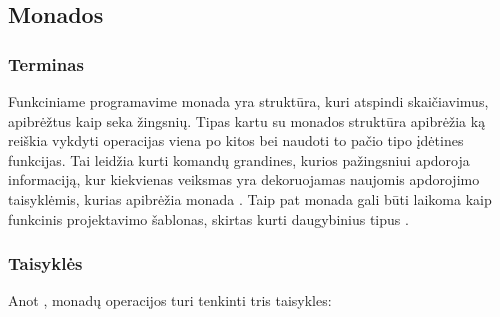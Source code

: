 \subsection{Monados}

\subsubsection{Terminas}

Funkciniame programavime monada yra struktūra, kuri atspindi skaičiavimus, apibrėžtus kaip seka žingsnių. Tipas kartu su monados struktūra apibrėžia ką reiškia vykdyti operacijas viena po kitos bei naudoti to pačio tipo įdėtines funkcijas. Tai leidžia kurti komandų grandines, kurios pažingsniui apdoroja informaciją, kur kiekvienas veiksmas yra dekoruojamas naujomis apdorojimo taisyklėmis, kurias apibrėžia monada \cite{OSullivan:2008:RWH:1523280}. Taip pat monada gali būti laikoma kaip funkcinis projektavimo šablonas, skirtas kurti daugybinius tipus \cite{monadicDesign}.

\subsubsection{Taisyklės}

Anot \cite{Wadler:1995:MFP:647698.734146}, monadų operacijos turi tenkinti tris taisykles:

